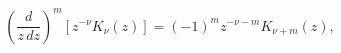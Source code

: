 \begin{equation}
\left(\frac{d}{z\, dz}\right)^{m}\left[z^{-\nu }K_{\nu }\left(z\right)\right]=\left(-1\right)^{m}z^{-\nu -m}K_{\nu +m}\left(z\right),\label{recursion 1}\end{equation}

